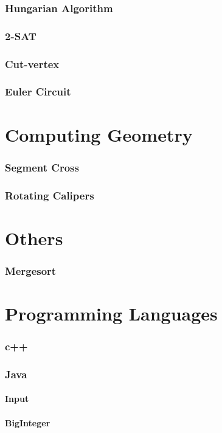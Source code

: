 \documentclass[a4paper, twocolumn, landscape]{article}
\begin{document}
\section{Hungarian Algorithm}

\section{2-SAT}

\section{Cut-vertex}

\section{Euler Circuit}


\part{Computing Geometry}
\section{Segment Cross}

\section{Rotating Calipers}


\part{Others}
\section{Mergesort}


\part{Programming Languages}
\section{c++}


\section{Java}
\subsection*{Input}

\subsection*{BigInteger}

\end{document}
